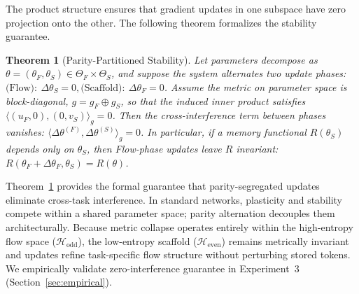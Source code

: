\documentclass{article}
\newcommand{\Heven}{\mathcal{H}_{\text{even}}}
\newcommand{\Hodd}{\mathcal{H}_{\text{odd}}}
\newtheorem{theorem}{Theorem}
\begin{document}
The product structure ensures that gradient updates in one subspace have zero projection onto the other. The following theorem formalizes the stability guarantee.
 
\begin{theorem}[Parity-Partitioned Stability]
\label{thm:parity_stability}
Let parameters decompose as $\theta=(\theta_F,\theta_S)\in\Theta_F\times\Theta_S$,
and suppose the system alternates two update phases:
$\text{(Flow)}:\ \Delta\theta_S=0,
\text{(Scaffold)}:\ \Delta\theta_F=0$.
Assume the metric on parameter space is block-diagonal,
$g = g_F \oplus g_S$, so that the induced inner product satisfies
$\langle (u_F,0),(0,v_S)\rangle_g = 0$.
Then the cross-interference term between phases vanishes:
$\langle \Delta\theta^{(F)}, \Delta\theta^{(S)}\rangle_g = 0$.
In particular, if a memory functional $R(\theta_S)$ depends only on $\theta_S$,
then Flow-phase updates leave $R$ invariant: $R(\theta_F+\Delta\theta_F,\theta_S)=R(\theta)$.
\end{theorem}
 
Theorem~\ref{thm:parity_stability} provides the formal guarantee that parity-segregated updates eliminate cross-task interference. In standard networks, plasticity and stability compete within a shared parameter space; parity alternation decouples them architecturally. Because metric collapse operates entirely within the high-entropy flow space ($\Hodd$), the low-entropy scaffold ($\Heven$) remains metrically invariant and updates refine task-specific flow structure without perturbing stored tokens. We empirically validate zero-interference guarantee in Experiment~3 (Section~\ref{sec:empirical}).
 
\end{document}
